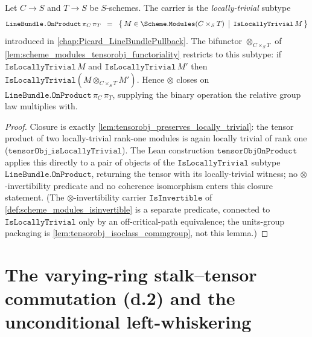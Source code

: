 \begin{lemma}





  \label{lem:tensorobj_lift_onproduct}
  Let \(C \to S\) and \(T \to S\) be \(S\)-schemes. The carrier is the
  \emph{locally-trivial} subtype
  \[
    \texttt{LineBundle.OnProduct}\,\pi_C\,\pi_T
    \;\;=\;\;
    \bigl\{\,M \in \Scheme.\mathtt{Modules}(C \times_S T)
            \,\bigm|\, \mathtt{IsLocallyTrivial}\,M \,\bigr\}
  \]
  introduced in \cref{chap:Picard_LineBundlePullback}. The bifunctor
  \(\otimes_{C \times_S T}\) of
  \cref{lem:scheme_modules_tensorobj_functoriality} restricts to this subtype:
  if \(\mathtt{IsLocallyTrivial}\,M\) and \(\mathtt{IsLocallyTrivial}\,M'\) then
  \(\mathtt{IsLocallyTrivial}(M \otimes_{C \times_S T} M')\). Hence \(\otimes\)
  closes on \(\texttt{LineBundle.OnProduct}\,\pi_C\,\pi_T\), supplying the binary
  operation the relative group law multiplies with.
\end{lemma}

\begin{proof}
  \leanok
  Closure is exactly
  \cref{lem:tensorobj_preserves_locally_trivial}: the tensor product of two
  locally-trivial rank-one modules is again locally trivial of rank one
  (\(\mathtt{tensorObj\_isLocallyTrivial}\)). The Lean construction
  \(\mathtt{tensorObjOnProduct}\) applies this directly to a pair of objects of
  the \(\mathtt{IsLocallyTrivial}\) subtype \(\texttt{LineBundle.OnProduct}\),
  returning the tensor with its locally-trivial witness; no
  \(\otimes\)-invertibility predicate and no coherence isomorphism enters this
  closure statement. (The \(\otimes\)-invertibility carrier
  \(\mathtt{IsInvertible}\) of \cref{def:scheme_modules_isinvertible} is a
  separate predicate, connected to \(\mathtt{IsLocallyTrivial}\) only by an
  off-critical-path equivalence; the units-group packaging is
  \cref{lem:tensorobj_isoclass_commgroup}, not this lemma.)
\end{proof}

\section{The varying-ring stalk--tensor commutation (d.2) and the unconditional
left-whiskering}
\label{sec:tensorobj_stalk_tensor}

